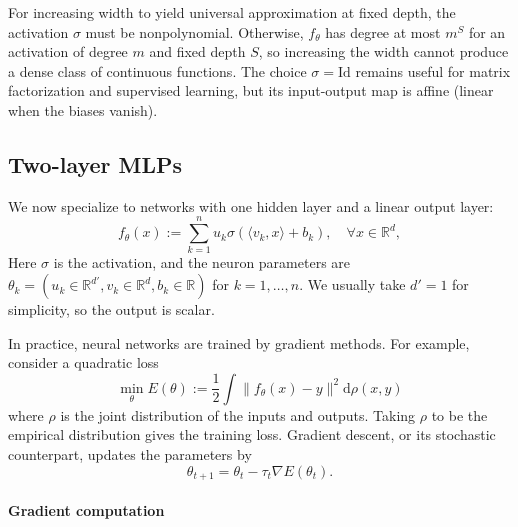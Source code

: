 For increasing width to yield universal approximation at fixed depth, the activation $\sigma$ must be nonpolynomial.
Otherwise, $f_\theta$ has degree at most $m^S$ for an activation of degree $m$ and fixed depth $S$, so increasing the width cannot produce a dense class of continuous functions.
%
The choice $\sigma=\mathrm{Id}$ remains useful for matrix factorization and supervised learning, but its input-output map is affine (linear when the biases vanish).


\subsection{Two-layer MLPs}

We now specialize to networks with one hidden layer and a linear output layer:
\begin{equation}
    f_\theta(x) := \sum_{k=1}^n u_k \sigma(\langle v_k, x \rangle + b_k), \quad \forall x \in \mathbb{R}^d, \label{eq:2layers-nn}
\end{equation}
Here $\sigma$ is the activation, and the neuron parameters are $\theta_k = (u_k \in \mathbb{R}^{d'}, v_k \in \mathbb{R}^d, b_k \in \mathbb{R})$ for $k = 1, \dots, n$. We usually take $d'=1$ for simplicity, so the output is scalar.

In practice, neural networks are trained by gradient methods. For example, consider a quadratic loss
\begin{equation}\label{eq:loss-training}
	\min_\theta E(\theta) := \frac12\int\|f_\theta(x)-y\|^2\mathrm{d}\rho(x,y)
\end{equation}
where $\rho$ is the joint distribution of the inputs and outputs. Taking $\rho$ to be the empirical distribution gives the training loss. Gradient descent, or its stochastic counterpart, updates the parameters by
$$
	\theta_{t+1} = \theta_t -  \tau_t \nabla E(\theta_t).
$$

\paragraph{Gradient computation}

